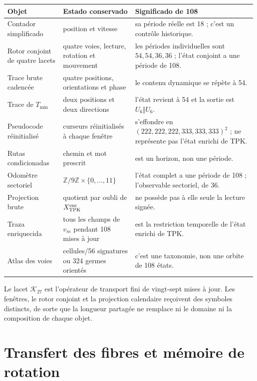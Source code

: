 \begin{longtable}{@{}>{\raggedright\arraybackslash}p{}>{\raggedright\arraybackslash}p{}>{\raggedright\arraybackslash}p{}@{}}
\toprule
Objet&Estado conservado&Significado de 108\\\midrule
\endhead
Contador simplificado&position et vitesse&sa période réelle est 18 ; c'est un
contrôle historique.\\
Rotor conjoint de quatre lacets&quatre voies, lecture, rotation et mouvement&
les périodes individuelles sont \(54,54,36,36\) ; l'état conjoint a une
période de 108.\\
Trace brute cadencée&quatre positions, orientations et phase&le contenu
dynamique se répète à 54.\\
Trace de \(T_{\min}\)&deux positions et deux directions&l'état revient à
54 et la sortie est \(U_6\Vert U_6\).\\
Pseudocode réinitialisé&curseurs réinitialisés à chaque fenêtre&s'effondre en
\((222,222,222,333,333,333)^2\) ; ne représente pas l'état enrichi de TPK.\\
Rutas condicionadas&chemin et mot prescrit&108 est un horizon, non une période.\\
Odomètre sectoriel&\(\mathbb Z/9\mathbb Z\times\{0,\ldots,11\}\)&l'état
complet a une période de 108 ; l'observable sectoriel, de 36.\\
Projection brute&quotient par oubli de \(X_{\rm TPK}^{\rm enr}\)&ne possède pas
à elle seule la lecture signée.\\
Traza enriquecida&tous les champs de \(v_m\) pendant 108 mises à jour&est
la restriction temporelle de l'état enrichi de TPK.\\
Atlas des voies&81 cellules/56 signatures ou 324 germes orientés&c'est une taxonomie,
non une orbite de 108 états.\\
\bottomrule
\end{longtable}

Le lacet \(\mathcal K_{27}\) est l'opérateur de transport fini de
vingt-sept mises à jour. Les fenêtres, le rotor conjoint et la projection
calendaire reçoivent des symboles distincts, de sorte que la longueur partagée
ne remplace ni le domaine ni la composition de chaque objet.

\section{Transfert des fibres et mémoire de rotation}

